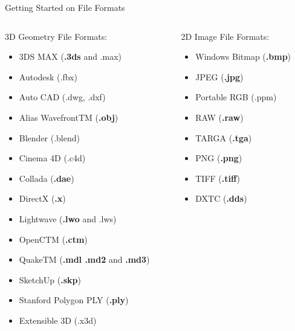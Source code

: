 \begin{frame}{Getting Started on File Formats}

	\center
	\small

	\begin{columns}[t]
		\begin{column}{0.4\textwidth}

			3D Geometry File Formats:\medskip

			\begin{itemize}\scriptsize
				\item 3DS MAX (\textbf{.3ds} and .max)
				\item Autodesk (.fbx)
				\item Auto CAD (.dwg, .dxf)
				\item Alias WavefrontTM (\textbf{.obj})
				\item Blender (.blend)
				\item Cinema 4D (.c4d)
				\item Collada (\textbf{.dae})
				\item DirectX (\textbf{.x})
				\item Lightwave (\textbf{.lwo} and .lws)	
				\item OpenCTM (\textbf{.ctm})
				\item QuakeTM (\textbf{.mdl .md2} and \textbf{.md3})	
				\item SketchUp (\textbf{.skp})
				\item Stanford Polygon PLY (\textbf{.ply})
				\item Extensible 3D (.x3d)
			\end{itemize}

		\end{column}
		\begin{column}{0.3\textwidth}

			2D Image File Formats:\medskip

			\begin{itemize}\scriptsize
				\item Windows Bitmap (\textbf{.bmp})
				\item JPEG (\textbf{.jpg})
				\item Portable RGB (.ppm)
				\item RAW (\textbf{.raw})
				\item TARGA (\textbf{.tga})
				\item PNG (\textbf{.png})
				\item TIFF (\textbf{.tiff})
				\item DXTC (\textbf{.dds})
			\end{itemize}

		\end{column}
	\end{columns}

	\bigskip

\end{frame}


